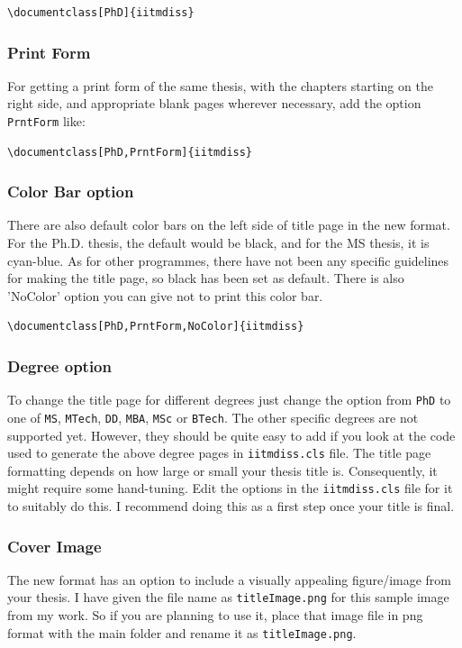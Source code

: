 \begin{verbatim}
\documentclass[PhD]{iitmdiss}  
\end{verbatim}

\subsubsection{Print Form}
For getting a print form of the same thesis, with the chapters starting on the right side, and appropriate blank pages wherever necessary, add the option \verb+PrntForm+ like:
\begin{verbatim}
\documentclass[PhD,PrntForm]{iitmdiss}  
\end{verbatim}

\subsubsection{Color Bar option}
There are also default color bars on the left side of title page in the new format. For the Ph.D. thesis, the default would be black, and for the MS thesis, it is cyan-blue. As for other programmes, there have not been any specific guidelines for making the title page, so black has been set as default. There is also 'NoColor' option you can give not to print this color bar.

\begin{verbatim}
\documentclass[PhD,PrntForm,NoColor]{iitmdiss}  
\end{verbatim}

\subsubsection{Degree option}
To change the title page for different degrees just change the option from \verb+PhD+ to one of \verb+MS+, \verb+MTech+, \verb+DD+, \verb+MBA+, \verb+MSc+ or \verb+BTech+. The other specific degrees are not supported yet. However, they should be quite easy to add if you look at the code used to generate the above degree pages in \verb+iitmdiss.cls+ file.  The title page formatting depends on how large or small your thesis title is.  Consequently, it might require some hand-tuning.  Edit the options in the \verb+iitmdiss.cls+ file for it to suitably do this. I recommend doing this as a first step once your title is final.

\subsubsection{Cover Image}
The new format has an option to include a visually appealing figure/image from your thesis. I have given the file name as \verb+titleImage.png+ for this sample image from my work. So if you are planning to use it, place that image file in png format with the main folder and rename it as \verb+titleImage.png+. 

